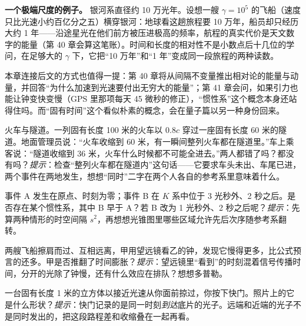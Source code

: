 \begin{mainline}
\textbf{一个极端尺度的例子。} 银河系直径约 10 万光年。设想一艘 \(\gamma=10^{5}\) 的飞船（速度只比光速小约百亿分之五）横穿银河：地球看这趟旅程要 10 万年，船员却只经历大约 1 年——沿途星光在他们前方被压进极高的频率，航程的真实代价是天文数字的能量（第 40 章会算这笔账）。时间和长度的相对性不是小数点后十几位的学问，在足够大的 \(\gamma\) 下，它把“10 万年”和“1 年”变成同一段旅程的两种读数。

本章连接后文的方式也值得一提：第 40 章将从间隔不变量推出相对论的能量与动量，并回答“为什么加速到光速要付出无穷大的能量”；第 41 章会问，如果引力也能让钟变快变慢（GPS 里那项每天 45 微秒的修正），“惯性系”这个概念本身还站得住吗。而“固有时间”这个看似朴素的概念，会在量子篇以另一种身份回来。
\end{mainline}

\begin{puzzles}
  \item 火车与隧道。一列固有长度 100 米的火车以 \(0.8c\) 穿过一座固有长度 60 米的隧道。地面管理员说：“火车收缩到 60 米，有一瞬间整列火车都在隧道里。”车上乘客说：“隧道收缩到 36 米，火车什么时候都不可能全进去。”两人都错了吗？都没有吗？\emph{提示}：检查“整列火车都在隧道内”这句话——它要求车头未出、车尾已进，两个事件在两地发生，想想“同时”二字在两个人各自的参考系里意味着什么。

  \item 事件 A 发生在原点、时刻为零；事件 B 在 \(K\) 系中位于 3 光秒外、2 秒之后。是否存在某个惯性系，其中 B 早于 A？若 B 改为 1 光秒外、2 秒之后呢？\emph{提示}：先算两种情形的时空间隔 \(s^{2}\)，再想想光锥图里哪些区域允许先后次序随参考系翻转。

  \item 两艘飞船擦肩而过、互相远离，甲用望远镜看乙的钟，发现它慢得更多，比公式预言的还多。甲是否推翻了时间膨胀？\emph{提示}：望远镜里“看到”的时刻混着信号传播时间，分开的光除了钟慢，还有什么效应在排队？想想多普勒。

  \item 一台固有长度 1 米的立方体以接近光速从你面前掠过，你按下快门。照片上的它是什么形状？\emph{提示}：快门记录的是同一时刻\emph{到达}底片的光子。远端和近端的光子不是同时发出的，把这段路程差和收缩叠在一起再看。
\end{puzzles}
